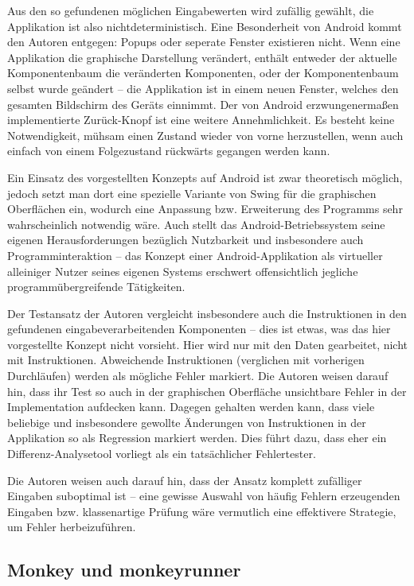 Aus den so gefundenen möglichen Eingabewerten wird zufällig gewählt,
die Applikation ist also nichtdeterministisch. Eine Besonderheit von Android
kommt den Autoren entgegen: Popups oder seperate Fenster existieren nicht.
Wenn eine Applikation die graphische Darstellung verändert, enthält entweder
der aktuelle Komponentenbaum die veränderten Komponenten, oder der
Komponentenbaum selbst wurde geändert -- die Applikation ist in einem neuen Fenster,
welches den gesamten Bildschirm des Geräts einnimmt.
Der von Android erzwungenermaßen implementierte \glqq{}Zurück\grqq{}-Knopf ist
eine weitere Annehmlichkeit. Es besteht keine Notwendigkeit, mühsam einen Zustand wieder
von vorne herzustellen, wenn auch einfach von einem Folgezustand rückwärts
gegangen werden kann.

Ein Einsatz des vorgestellten Konzepts auf Android ist zwar theoretisch möglich, jedoch setzt
man dort eine spezielle Variante von Swing für die graphischen Oberflächen ein, 
wodurch eine Anpassung bzw. Erweiterung des Programms sehr wahrscheinlich notwendig wäre. 
Auch stellt das Android-Betriebssystem seine eigenen Herausforderungen
bezüglich Nutzbarkeit und insbesondere auch Programminteraktion -- das Konzept
einer Android-Applikation als virtueller alleiniger Nutzer seines eigenen Systems
erschwert offensichtlich jegliche programmübergreifende Tätigkeiten.

Der Testansatz der Autoren vergleicht insbesondere auch die Instruktionen in den gefundenen
eingabeverarbeitenden Komponenten -- dies ist etwas, was das hier vorgestellte Konzept nicht
vorsieht. Hier wird nur mit den Daten gearbeitet, nicht mit Instruktionen. Abweichende
Instruktionen (verglichen mit vorherigen Durchläufen) werden als mögliche Fehler markiert.
Die Autoren weisen darauf hin, dass ihr Test so auch in der graphischen Oberfläche
unsichtbare Fehler in der Implementation aufdecken kann. Dagegen gehalten werden kann,
dass viele beliebige und insbesondere gewollte Änderungen von Instruktionen in
der Applikation so als Regression markiert werden. Dies führt dazu, dass eher ein
Differenz-Analysetool vorliegt als ein tatsächlicher Fehlertester.

Die Autoren weisen auch darauf hin, dass der Ansatz komplett zufälliger Eingaben
suboptimal ist -- eine gewisse Auswahl von häufig Fehlern erzeugenden Eingaben
bzw. klassenartige Prüfung wäre vermutlich eine effektivere Strategie, um Fehler
herbeizuführen.


\subsection{Monkey und monkeyrunner}

